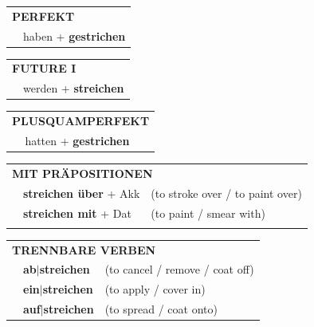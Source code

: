 \documentclass[10pt,a4paper]{revtex4-2}
\begin{document}
\begin{verbbox}
 \begin{tabular}{rl}
     \multicolumn{2}{l}{\textbf{PERFEKT}}\\
   & haben + \textbf{gestrichen}\\
  \end{tabular}
\hfill
\begin{tabular}{rl}
    \multicolumn{2}{l}{\textbf{FUTURE I}}\\
   & werden + \textbf{streichen}\\
  \end{tabular}
\hfill
\begin{tabular}{rl}
    \multicolumn{2}{l}{\textbf{PLUSQUAMPERFEKT}}\\
   & hatten + \textbf{gestrichen}\\
  \end{tabular}

 \vspace{10pt}

\begin{tabular}{lll}
      \multicolumn{3}{l}{\textbf{MIT PRÄPOSITIONEN}}\\
& \textbf{streichen über} + Akk & (to stroke over / to paint over)\\
& \textbf{streichen mit} + Dat & (to paint / smear with)\\
\vspace{10pt}
\end{tabular}
  \hfill
\begin{tabular}{lll}
      \multicolumn{3}{l}{\textbf{TRENNBARE VERBEN}}\\
 & \textbf{ab$|$streichen} & (to cancel / remove / coat off)\\
 & \textbf{ein$|$streichen} & (to apply / cover in)\\
 & \textbf{auf$|$streichen} & (to spread / coat onto)\\
  \end{tabular}


\vspace{-5pt}
\end{verbbox}
\end{document}
